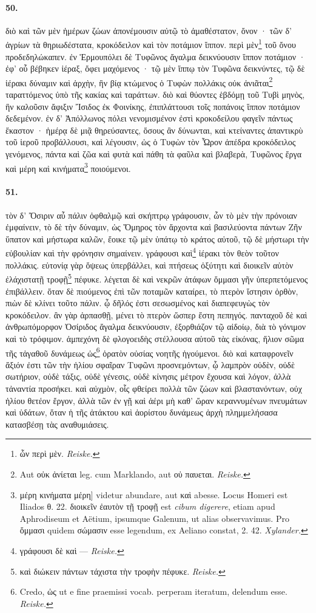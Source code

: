 \documentclass[a4paper, 11pt, oneside, polutonikogreek, german]{article}
\begin{document}
\paragraph{50.}
διὸ καὶ τῶν μὲν ἡμέρων ζώων ἀπονέμουσιν αὐτῷ τὸ ἀμαθέστατον, ὄνον · τῶν δ' ἀγρίων τὰ θηριωδέστατα, κροκόδειλον καὶ τὸν ποτάμιον ἵππον. περὶ μὲν\footnote{ὧν περὶ μὲν. \emph{Reiske.}} τοῦ ὄνου προδεδηλώκαπεν. ἐν Ἑρμουπόλει δὲ Τυφῶνος ἄγαλμα δεικνύουσιν ἵππον ποτάμιον · ἐφ' οὗ βέβηκεν ἱέραξ, ὄφει μαχόμενος · τῷ μὲν ἵππῳ τὸν Τυφῶνα δεικνύντες, τῷ δὲ ἱέρακι δύναμιν καὶ ἀρχὴν, ἣν βίᾳ κτώμενος ὁ Τυφὼν πολλάκις οὐκ ἀνιᾶται\footnote{Aut οὐκ ἀνίεται leg. cum Marklando, aut οὐ παυεται. \emph{Reiske.}} ταραττόμενος ὑπὸ τῆς κακίας καὶ ταράττων. διὸ καὶ θύοντες ἑβδόμῃ τοῦ Τυβὶ μηνὸς, ἣν καλοῦσιν ἄφιξιν Ἴσιδος ἐκ Φοινίκης, ἐπιπλάττουσι τοῖς ποπάνοις ἵππον ποτάμιον δεδεμένον. ἐν δ' Ἀπόλλωνος πόλει νενομισμένον ἐστὶ κροκοδείλου φαγεῖν πάντως ἕκαστον · ἡμέρᾳ δὲ μιᾷ θηρεύσαντες, ὅσους ἂν δύνωνται, καὶ κτείναντες ἀπαντικρὺ τοῦ ἱεροῦ προβάλλουσι, καὶ λέγουσιν, ὡς ὁ Τυφὼν τὸν Ὧρον ἀπέδρα κροκόδειλος γενόμενος, πάντα καὶ ζῶα καὶ φυτὰ καὶ πάθη τὰ φαῦλα καὶ βλαβερὰ, Τυφῶνος ἔργα καὶ μέρη καὶ κινήματα\footnote{μέρη κινήματα μέρη] videtur abundare, aut καὶ abesse. Locus Homeri est Iliados θ. 22. διοικεῖν ἐαυτὸν τῇ τροφῇ est \emph{cibum digerere}, etiam apud Aphrodiseum et Aëtium, ipsumque Galenum, ut alias observavimus. Pro ὄμμασι quidem σώμασιν esse legendum, ex Aeliano constat, 2. 42. \emph{Xylander.}} ποιούμενοι.

\paragraph{51.}
τὸν δ' Ὄσιριν αὖ πάλιν ὀφθαλμῷ καὶ σκήπτρῳ γράφουσιν, ὧν τὸ μὲν τὴν πρόνοιαν ἐμφαίνειν, τὸ δὲ τὴν δύναμιν, ὡς Ὅμηρος τὸν ἄρχοντα καὶ βασιλεύοντα πάντων Ζῆν ὕπατον καὶ μήστωρα καλῶν, ἔοικε τῷ μὲν ὑπάτῳ τὸ κράτος αὐτοῦ, τῷ δὲ μήστωρι τὴν εὐβουλίαν καὶ τὴν φρόνησιν σημαίνειν. γράφουσι καὶ\footnote{γράφουσι δὲ καὶ --- \emph{Reiske.}} ἱέρακι τὸν θεὸν τοῦτον πολλάκις. εὐτονίᾳ γὰρ ὄψεως ὑπερβάλλει, καὶ πτήσεως ὀξύτητι καὶ διοικεῖν αὑτὸν ἐλάχιστατῇ τροφῇ\footnote{καὶ διώκειν πάντων τάχιστα τὴν τροφὴν πέφυκε. \emph{Reiske.}} πέφυκε. λέγεται δὲ καὶ νεκρῶν ἀτάφων ὄμμασι γῆν ὑπερπετόμενος ἐπιβάλλειν. ὅταν δὲ πιούμενος ἐπὶ τῶν ποταμῶν καταίρει, τὸ πτερὸν ἵστησιν ὀρθὸν, πιὼν δὲ κλίνει τοῦτο πάλιν. ᾧ δῆλός ἐστι σεσωσμένος καὶ διαπεφευγὼς τὸν κροκόδειλον. ἂν γὰρ ἁρπασθῇ, μένει τὸ πτερὸν ὥσπερ ἔστη πεπηγός. πανταχοῦ δὲ καὶ ἀνθρωπόμορφον Ὀσίριδος ἄγαλμα δεικνύουσιν, ἐξορθιάζον τῷ αἰδοίῳ, διὰ τὸ γόνιμον καὶ τὸ τρόφιμον. ἀμπεχόνη δὲ φλογοειδὴς στέλλουσα αὐτοῦ τὰς εἰκόνας, ἥλιον σῶμα τῆς τἀγαθοῦ δυνάμεως ὡς\footnote{Credo, ὡς ut e fine praemissi vocab. perperam iteratum, delendum esse. \emph{Reiske.}} ὁρατὸν οὐσίας νοητῆς ἡγούμενοι. διὸ καὶ καταφρονεῖν ἄξιόν ἐστι τῶν τὴν ἡλίου σφαῖραν Τυφῶνι προσνεμόντων, ᾧ λαμπρὸν οὐδὲν, οὐδὲ σωτήριον, οὐδὲ τάξις, οὐδὲ γένεσις, οὐδὲ κίνησις μέτρον ἔχουσα καὶ λόγον, ἀλλὰ τἀναντία προσήκει. καὶ αὐχμὸν, οἷς φθείρει πολλὰ τῶν ζώων καὶ βλαστανόντων, οὐχ ἡλίου θετέον ἔργον, ἀλλὰ τῶν ἐν γῇ καὶ ἀέρι μὴ καθ' ὥραν κεραννυμένων πνευμάτων καὶ ὑδάτων, ὅταν ἡ τῆς ἀτάκτου καὶ ἀορίστου δυνάμεως ἀρχὴ πλημμελήσασα κατασβέσῃ τὰς αναθυμιάσεις.
\end{document}
